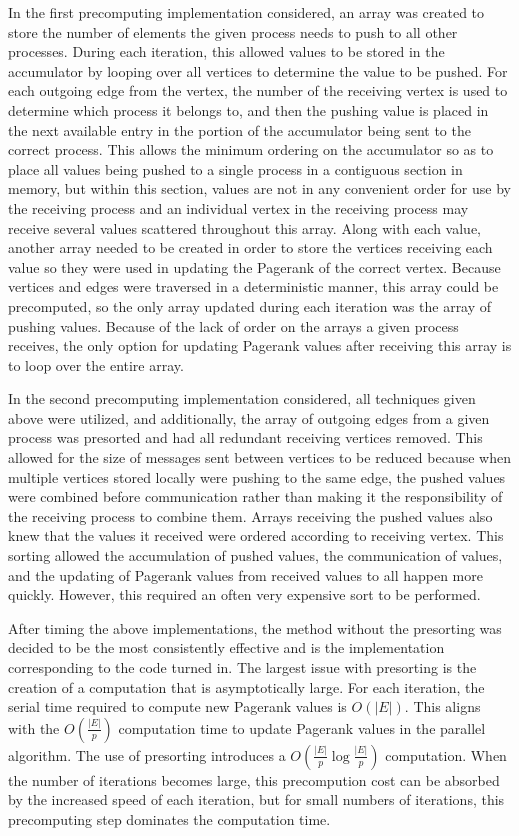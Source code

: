 \documentclass[a4paper]{article}
\begin{document}
In the first precomputing implementation considered, an array was created to store the number of elements the given process needs to push to all other
processes. During each iteration, this allowed values to be stored in the accumulator by looping over all vertices to determine the value to be
pushed. For each outgoing edge from the vertex, the number of the receiving vertex is used to determine which process it belongs to, and then the
pushing value is placed in the next available entry in the portion of the accumulator being sent to the correct process. This allows the minimum
ordering on the accumulator so as to place all values being pushed to a single process in a contiguous section in memory, but within this section,
values are not in any convenient order for use by the receiving process and an individual vertex in the receiving process may receive several values
scattered throughout this array. Along with each value, another array needed to be created in order to store the vertices receiving each value so they
were used in updating the Pagerank of the correct vertex. Because vertices and edges were traversed in a deterministic manner, this array could be
precomputed, so the only array updated during each iteration was the array of pushing values. Because of the lack of order on the arrays a given
process receives, the only option for updating Pagerank values after receiving this array is to loop over the entire
array.

In the second precomputing implementation considered, all techniques given above were utilized, and additionally, the array of outgoing edges from a
given process was presorted and had all redundant receiving vertices removed. This allowed for the size of messages sent between vertices to be
reduced because when multiple vertices stored locally were pushing to the same edge, the pushed values were combined before communication rather than
making it the responsibility of the receiving process to combine them. Arrays receiving the pushed values also knew that the values it received were
ordered according to receiving vertex. This sorting allowed the accumulation of pushed values, the communication of values, and the updating of
Pagerank values from received values to all happen more quickly. However, this required an often very expensive sort to be performed.

After timing the above implementations, the method without the presorting was decided to be the most consistently effective and is the implementation
corresponding to the code turned in. The largest issue with presorting is the creation of a computation that is asymptotically large. For each
iteration, the serial time required to compute new Pagerank values is $O(|E|)$. This aligns with the $O(\frac{|E|}{p})$ computation time to update
Pagerank values in the parallel algorithm. The use of presorting introduces a $O(\frac{|E|}{p} \log \frac{|E|}{p} )$ computation. When the number of
iterations becomes large, this precompution cost can be absorbed by the increased speed of each iteration, but for small numbers of iterations, this
precomputing step dominates the computation time.
\end{document}
